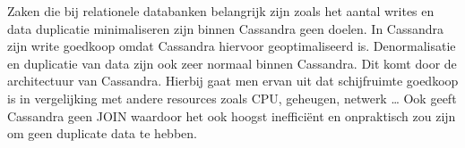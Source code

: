 Zaken die bij relationele databanken belangrijk zijn zoals het aantal writes en data duplicatie minimaliseren zijn binnen Cassandra geen doelen.
In Cassandra zijn write goedkoop omdat Cassandra hiervoor geoptimaliseerd is.
Denormalisatie en duplicatie van data zijn ook zeer normaal binnen Cassandra.
Dit komt door de architectuur van Cassandra.
Hierbij gaat men ervan uit dat schijfruimte goedkoop is in vergelijking met andere resources zoals CPU, geheugen, netwerk \ldots
Ook geeft Cassandra geen JOIN waardoor het ook hoogst inefficiënt en onpraktisch zou zijn om geen duplicate data te hebben.